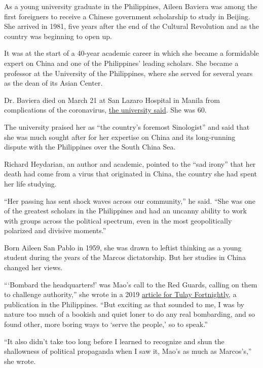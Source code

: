 As a young university graduate in the Philippines, Aileen Baviera was
among the first foreigners to receive a Chinese government scholarship
to study in Beijing. She arrived in 1981, five years after the end of
the Cultural Revolution and as the country was beginning to open up.

It was at the start of a 40-year academic career in which she became a
formidable expert on China and one of the Philippines' leading scholars.
She became a professor at the University of the Philippines, where she
served for several years as the dean of its Asian Center.

Dr. Baviera died on March 21 at San Lazaro Hospital in Manila from
complications of the coronavirus,
\href{https://upd.edu.ph/baviera-60/?fbclid=IwAR1_Z18-pGK5rS6yRhDe1fAzP622HsCN1fxHlQUU7GQKhttSGB26TKIvZ4s}{the
university said}. She was 60.

The university praised her as ``the country's foremost Sinologist'' and
said that she was much sought after for her expertise on China and its
long-running dispute with the Philippines over the South China Sea.

Richard Heydarian, an author and academic, pointed to the ``sad irony''
that her death had come from a virus that originated in China, the
country she had spent her life studying.

``Her passing has sent shock waves across our community,'' he said.
``She was one of the greatest scholars in the Philippines and had an
uncanny ability to work with groups across the political spectrum, even
in the most geopolitically polarized and divisive moments.''

Born Aileen San Pablo in 1959, she was drawn to leftist thinking as a
young student during the years of the Marcos dictatorship. But her
studies in China changed her views.

```Bombard the headquarters!' was Mao's call to the Red Guards, calling
on them to challenge authority,'' she wrote in a 2019
\href{https://tulay.ph/2019/08/20/forty-years-of-china-watching-from-the-eyes-of-a-filipino/}{article
for Tulay Fortnightly}, a publication in the Philippines. ``But exciting
as that sounded to me, I was by nature too much of a bookish and quiet
loner to do any real bombarding, and so found other, more boring ways to
`serve the people,' so to speak.''

``It also didn't take too long before I learned to recognize and shun
the shallowness of political propaganda when I saw it, Mao's as much as
Marcos's,'' she wrote.

